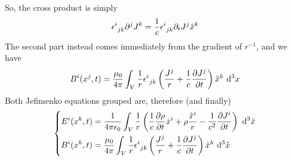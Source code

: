 \documentclass[../electromagnetism.tex]{subfiles}
\begin{document}
So, the cross product is simply
\begin{equation*}
	\epsilon^{i}_{\ jk}\partial^jJ^k=\frac{1}{c}\epsilon^{i}_{\ jk}\partial_tJ^j\hat{x}^k
\end{equation*}
The second part instead comes immediately from the gradient of $r^{-1}$, and we have 
\begin{equation}
	B^i(x^j,t)=\frac{\mu_0}{4\pi}\int_{V}^{}\frac{1}{r}\epsilon^{i}_{\ jk}\left( \frac{J^j}{r}+\frac{1}{c}\pdv{J^j}{t} \right)\hat{x}^k\ \mathrm{d}^{3}{x}
	\label{eq:Bfimenko}
\end{equation}
Both Jefimenko equations grouped are, therefore (and finally)
\begin{equation}
	\left\{	\begin{aligned}
		E^i(x^k,t)&=\frac{1}{4\pi\epsilon_0}\int_{V}^{}\frac{1}{r}\left( \frac{1}{c}\pdv{\rho}{t}\hat{x}^i+\rho\frac{\hat{x}^i}{r}-\frac{1}{c^2}\pdv{J^i}{t}\right)\ \mathrm{d}^{3}{\tilde{x}}\\
		B^i(x^k,t)&=\frac{\mu_0}{4\pi}\int_{V}^{}\frac{1}{r}\epsilon^{i}_{\ jk}\left( \frac{J^j}{r}+\frac{1}{c}\pdv{J^j}{t} \right)\hat{x}^k\ \mathrm{d}^{3}{\tilde{x}}
	\end{aligned}\right.
	\label{eq:Jefimenko}
\end{equation}
\end{document}
